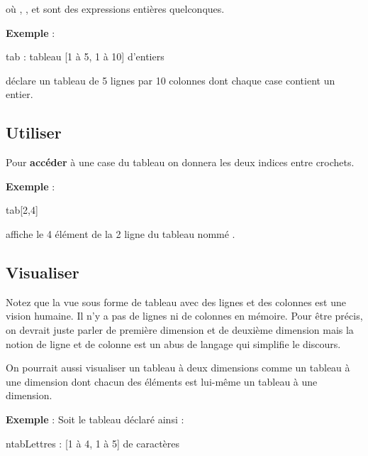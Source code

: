 	où , , 
	 et  sont des
	expressions entières quelconques.

	\textbf{Exemple} :
	
	\begin{Pseudocode}
		\Stmt tab : tableau [1 à 5, 1 à 10] d'entiers
	\end{Pseudocode}
	
	déclare un tableau de 5 lignes par 10 colonnes dont chaque case
	contient un entier.
	
\subsection{Utiliser}
	\marginicon{definition}
	Pour \textbf{accéder} à une case du tableau on donnera les deux indices
	entre crochets.
	
	\textbf{Exemple} :
	
	\begin{Pseudocode}
		\Stmt \Write tab[2,4]
	\end{Pseudocode}
	
	affiche le 4\ieme{} élément de la 2\ieme{} ligne
	du tableau nommé \pseudocode{tab}.


\subsection{Visualiser}

	Notez que la vue sous forme de tableau avec des lignes
	et des colonnes est une vision humaine.
	Il n'y a pas de lignes ni de colonnes en mémoire.
	Pour être précis,
	on devrait juste parler de première dimension et
	de deuxième dimension
	mais la notion de ligne et de colonne
	est un abus de langage qui simplifie le discours.
	
	On pourrait aussi visualiser un tableau à deux dimensions
	comme un tableau à une dimension dont chacun des éléments est
	lui-même un tableau à une dimension.

	\textbf{Exemple} : Soit le tableau déclaré ainsi :

	\begin{Pseudocode}
	\Decl ntabLettres : [1 à 4, 1 à 5] de caractères
	\end{Pseudocode}

